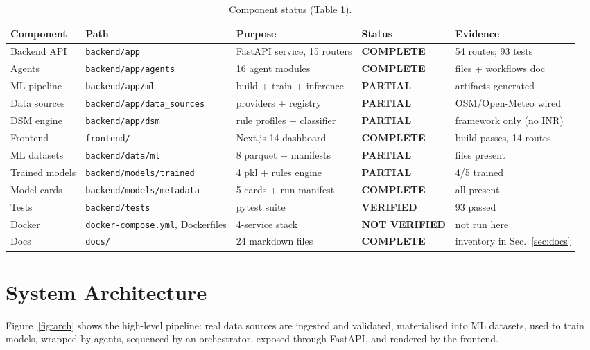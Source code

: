 \documentclass[11pt,a4paper]{article}
\newcommand{\stC}{\textcolor{cok}{\textbf{COMPLETE}}}
\newcommand{\stV}{\textcolor{cok}{\textbf{VERIFIED}}}
\newcommand{\stP}{\textcolor{cpart}{\textbf{PARTIAL}}}
\newcommand{\stNV}{\textcolor{cnv}{\textbf{NOT VERIFIED}}}
\newcommand{\code}[1]{\texttt{\small #1}}
\begin{document}
\begin{table}[H]
\centering
\caption{Component status (Table 1).}
\label{tab:components}
\footnotesize
\begin{tabular}{@{}p{2.6cm}p{3.1cm}p{4.2cm}l l@{}}
\toprule
\textbf{Component} & \textbf{Path} & \textbf{Purpose} & \textbf{Status} & \textbf{Evidence}\\
\midrule
Backend API & \code{backend/app} & FastAPI service, 15 routers & \stC & 54 routes; 93 tests\\
Agents & \code{backend/app/agents} & 16 agent modules & \stC & files + workflows doc\\
ML pipeline & \code{backend/app/ml} & build + train + inference & \stP & artifacts generated\\
Data sources & \code{backend/app/data\_sources} & providers + registry & \stP & OSM/Open-Meteo wired\\
DSM engine & \code{backend/app/dsm} & rule profiles + classifier & \stP & framework only (no INR)\\
Frontend & \code{frontend/} & Next.js 14 dashboard & \stC & build passes, 14 routes\\
ML datasets & \code{backend/data/ml} & 8 parquet + manifests & \stP & files present\\
Trained models & \code{backend/models/trained} & 4 pkl + rules engine & \stP & 4/5 trained\\
Model cards & \code{backend/models/metadata} & 5 cards + run manifest & \stC & all present\\
Tests & \code{backend/tests} & pytest suite & \stV & 93 passed\\
Docker & \code{docker-compose.yml}, Dockerfiles & 4-service stack & \stNV & not run here\\
Docs & \code{docs/} & 24 markdown files & \stC & inventory in Sec.~\ref{sec:docs}\\
\bottomrule
\end{tabular}
\end{table}

\section{System Architecture}
Figure~\ref{fig:arch} shows the high-level pipeline: real data sources are ingested and
validated, materialised into ML datasets, used to train models, wrapped by agents,
sequenced by an orchestrator, exposed through FastAPI, and rendered by the frontend.
\end{document}
